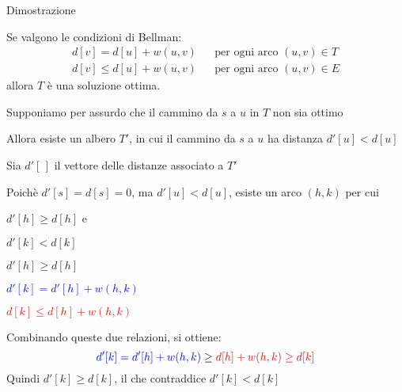 \begin{frame}{Dimostrazione}

\vspace{-9pt}
\begin{myboxtitle}
Se valgono le condizioni di Bellman:
\begin{align*} 
d[v] = d[u] + w(u,v) && \textrm{per ogni arco $(u,v) \in T$}\\
d[v] \leq d[u] + w(u,v) && \textrm{per ogni arco $(u,v) \in E$}
\end{align*}
allora $T$ è una soluzione ottima.
\end{myboxtitle}

\small
\vspace{-4pt}
\begin{overprint}
\BI
\item Supponiamo per assurdo che il cammino da $s$ a $u$ in $T$ non sia ottimo
\item Allora esiste un albero $T'$, in cui il cammino
da $s$ a $u$ ha distanza $d'[u]<d[u]$
\item Sia $d'[\,]$ il vettore delle distanze associato a $T'$
\EI


\BI
\item Poichè $d'[s] = d[s] = 0$, ma $d'[u]<d[u]$, esiste un arco $(h,k)$  per cui 
\BI
\item $d'[h] \geq d[h]$ e 
\item $d'[k]< d[k]$
\EI
\EI

\begin{center}
\end{center}

\BI
\item {} $d'[h] \geq d[h]$
\item {} \textcolor{blue}{$d'[k] = d'[h] + w(h,k)$}
\item {} \textcolor{red}{$d[k] \le d[h] + w(h,k)$}
\item Combinando queste due relazioni, si ottiene: 
\[
  \textcolor{blue}{d'[k] = d'[h] + w(h,k)} \ge \textcolor{red}{d[h] + w(h,k) \ge d[k]}
\]
Quindi $d'[k] \ge d[k]$, il che contraddice $d'[k] < d[k]$
\EI
\end{overprint}

\end{frame}

